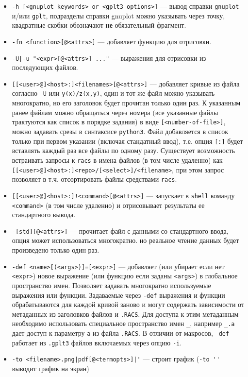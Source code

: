 \documentclass[12pt]{article}
\def\gplt{{\tt gplt}}
\def\gnuplot{{\tt gnuplot}}
\def\python{{\tt python3}}
\begin{document}
\begin{itemize}
\item \verb'-h [<gnuplot keywords> or <gplt3 options>]' --- вывод справки \gnuplot{} и/или \gplt, 
  подразделы справки gnuplot можно указывать через точку, квадратные скобки обозначают {\bf не} обязательный фрагмент.
\item \verb'-fn <function>[@<attrs>]' --- добавляет функцию для отрисовки.
\item \verb'-U|-u "<expr>[@<attrs>] ..."' --- выражения для отрисовки из последующих файлов.
\item \verb'[[<user>@]<host>:]<filenames>[@<attrs>]' --- добавляет кривые из файла согласно \verb'-U' или \verb'y(x)/z(x,y)', один и тот же файл можно
  указывать многократно, но его заголовок будет прочитан только один раз. К указанным ранее файлам можно обращаться
  через номера (все указанные файлы трактуются как список в порядке задания) в виде \verb'[<number-of-file>]', можно задавать
  срезы в синтаксисе \python. Файл добавляется в список только при первом указании (включая стандатный ввод), т.е. опция \verb'[:]' будет
  вставлять каждый раз все файлы по одному разу. Существует возможность встраивать запросы к \verb'racs'  в имена файлов (в том числе удаленно) как 
   \verb'[[<user>@]<host>:]<repo>/[<select>]/<filename>', при этом запрос позволяет в т.ч. отсортировать файлы средствами \verb'racs'.
\item \verb'[[<user>@]<host>:]!<command>[@<attrs>]' --- запускает в \verb'shell' команду \verb'<command>' (в том числе удаленно) и отрисовывает 
   результаты ее стандартного вывода.
\item \verb'-[std][@<attrs>]' --- прочитает файл с данными со стандартного ввода, опция может использоваться многократно. но реальное чтение данных
  будет произведено только один раз.
\item \verb'-def <name>[(<args>)]=[<expr>]' --- добавляет (или убирает если нет \verb'<expr>')
новое выражение (или функцию если заданы \verb'<args>') в глобальное пространство имен. Позволяет задавать 
многократно используемые выражения или функции. Задаваемые через \verb'-def' выражения и функции
обрабатываются для каждой кривой заново и могут содержать зависимости от метаданных из 
заголовков файлов и \verb'.RACS'. Для доступа к этим метаданным необходимо использовать специальное пространство имен \verb'_',
например \verb'_.a' дает доступ к параметру \verb'a' из файла \verb'.RACS'.
В отличии от макросов, \verb'-def' работает из \verb'.gplt3' файлов включаемых через опцию \verb'-i'.
\item \verb:-to <filename>.png|pdf[@<termopts>]|': --- строит график (\verb|-to ''| выводит график на экран)

\end{itemize}
\end{document}
